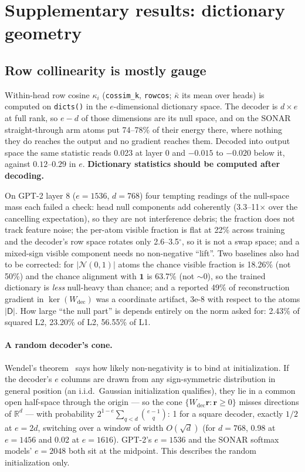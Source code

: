 \section{Supplementary results: dictionary geometry}
\label{app:geom}

\subsection{Row collinearity is mostly gauge}
\label{sec:rowcos}

Within-head row cosine $\kappa_i$ (\texttt{cossim\_k}, \texttt{rowcos};
$\bar\kappa$ its mean over heads) is computed on \texttt{dicts()} in the
$e$-dimensional dictionary space. The decoder
is $d\times e$ at full rank, so $e-d$ of those dimensions are its null
space, and on the SONAR straight-through arm atoms put 74--78\% of their
energy there, where nothing they do reaches the output and no gradient
reaches them. Decoded into output space the same statistic reads 0.023
at layer 0 and $-0.015$ to $-0.020$ below it, against $0.12$--$0.29$ in
$e$. \textbf{Dictionary statistics should be computed after decoding.}

On GPT-2 layer 8 ($e{=}1536$, $d{=}768$) four tempting readings of the
null-space mass each failed a check: head null components add coherently
(3.3--11$\times$ over the cancelling expectation), so they are not
interference debris; the fraction does not track feature noise; the
per-atom visible fraction is flat at 22\% across training and the
decoder's row space rotates only 2.6--3.5$^\circ$, so it is not a swap
space; and a mixed-sign visible component needs no non-negative ``lift''.
Two baselines also had to be corrected: for $\lvert\mathcal{N}(0,1)\rvert$
atoms the chance visible fraction is 18.26\% (not 50\%) and the chance
alignment with $\mathbf{1}$ is 63.7\% (not $\sim$0), so the trained
dictionary is \emph{less} null-heavy than chance; and a reported 49\% of
reconstruction gradient in $\ker(W_{\mathrm{dec}})$ was a coordinate
artifact, 3e-8 with respect to the atoms $\lvert\mathsf{D}\rvert$. How large ``the null part'' is depends
entirely on the norm asked for: 2.43\% of squared L2, 23.20\% of L2,
56.55\% of L1.

\paragraph{A random decoder's cone.} Wendel's theorem~\cite{wendel1962}
says how likely non-negativity is to bind at initialization. If the
decoder's $e$ columns are drawn from any sign-symmetric distribution in
general position (an i.i.d.\ Gaussian initialization qualifies), they lie
in a common open half-space through the origin --- so the cone
$\{W_{\mathrm{dec}}\mathbf{r} : \mathbf{r}\geq0\}$ misses directions of
$\mathbb{R}^d$ --- with probability $2^{1-e}\sum_{q<d}\binom{e-1}{q}$: 1
for a square decoder, exactly $1/2$ at $e{=}2d$, switching over a window
of width $O(\sqrt{d})$ (for $d{=}768$, 0.98 at $e{=}1456$ and 0.02 at
$e{=}1616$). GPT-2's $e{=}1536$ and the SONAR softmax models' $e{=}2048$
both sit at the midpoint. This describes the random initialization only.

